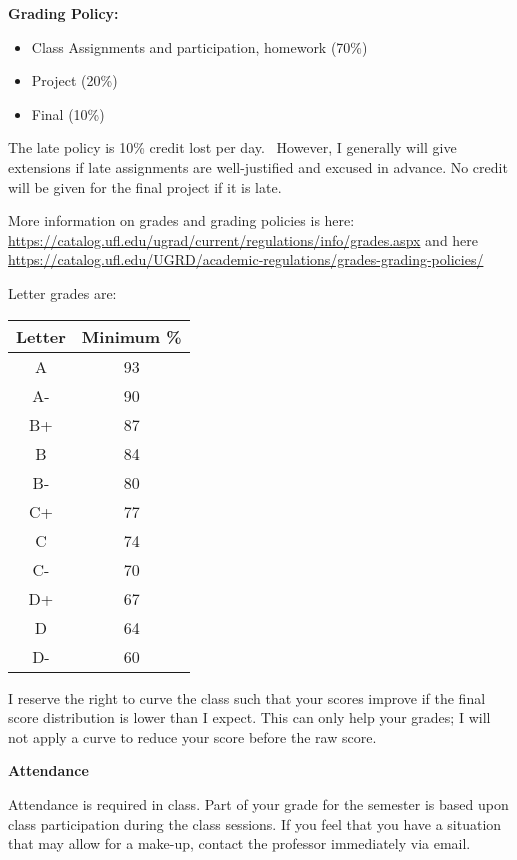 \documentclass[11pt]{article}
\begin{document}
\vspace*{.15in}
\noindent\textbf{Grading Policy:}
\begin{itemize}
    \item Class Assignments and participation, homework (70\%)
    \item Project (20\%)
    \item Final (10\%)
\end{itemize}

The late policy is 10\% credit lost per day.  However, I generally will give extensions if late assignments are well-justified and excused in advance.
No credit will be given for the final project if it is late.

More information on grades and grading policies is here:
\url{https://catalog.ufl.edu/ugrad/current/regulations/info/grades.aspx}
and here
\url{https://catalog.ufl.edu/UGRD/academic-regulations/grades-grading-policies/}


Letter grades are: \\
\begin{tabular}{|c|c|}
    \hline
    Letter & Minimum \% \\
    \hline
    A & 93 \\
    A- & 90 \\
    B+ & 87 \\
    B & 84 \\
    B- & 80 \\
    C+ & 77 \\
    C & 74 \\
    C- & 70 \\
    D+ & 67 \\
    D & 64 \\
    D- & 60 \\
    \hline
\end{tabular}

I reserve the right to curve the class such that your scores improve if the
final score distribution is lower than I expect.  This can only help your
grades; I will not apply a curve to reduce your score before the raw score.


\vspace{0.15in}
\noindent\textbf{Attendance}

Attendance is required in class. Part of your
grade for the semester is based upon class participation during the class
sessions. If you feel
that you have a situation that may allow for a make-up, contact the professor
immediately via email.
\end{document}
